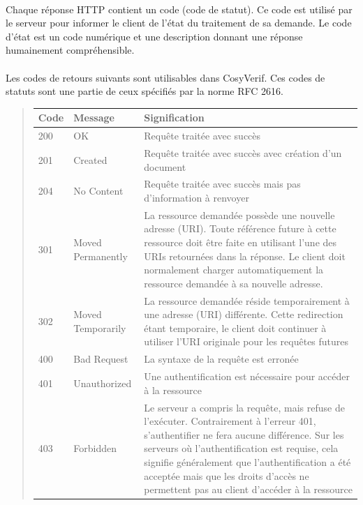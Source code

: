\documentclass{report}
\begin{document}
\paragraph{}
Chaque réponse HTTP contient un code (code de statut). Ce code est utilisé par le serveur pour informer le client de l'état 
du traitement de sa demande. Le code d'état est un code numérique et une description donnant une réponse 
humainement compréhensible. 

\paragraph{}
Les codes de retours suivants sont utilisables dans CosyVerif.
Ces codes de statuts sont une partie de ceux spécifiés par la norme RFC 2616.
\begin{quotation}
\begin{tabular}{|p{1cm}|p{4cm}|p{9cm}|}
\hline \bf Code & \bf Message & \bf Signification \\
\hline 200 & OK & Requête traitée avec succès \\
\hline 201 & Created & Requête traitée avec succès avec création d’un document \\
\hline 204 & No Content & Requête traitée avec succès mais pas d’information à renvoyer \\
\hline 301 & Moved Permanently & La ressource demandée possède une nouvelle adresse (URI). Toute référence future à cette ressource doit être faite en utilisant l'une des URIs retournées dans la réponse. Le client doit normalement charger 
automatiquement la ressource demandée à sa nouvelle adresse. \\
\hline 302 & Moved Temporarily & La ressource demandée réside temporairement à une adresse (URI) différente. Cette 
redirection étant temporaire, le client doit continuer à utiliser l'URI originale pour les requêtes futures \\
\hline 400 & Bad Request & La syntaxe de la requête est erronée \\
\hline 401 & Unauthorized & Une authentification est nécessaire pour accéder à la ressource \\
\hline 403 & Forbidden & Le serveur a compris la requête, mais refuse de l’exécuter. Contrairement à l’erreur 401, 
s’authentifier ne fera aucune différence. Sur les serveurs où l’authentification est requise, cela signifie généralement que 
l’authentification a été acceptée mais que les droits d’accès ne permettent pas au client d’accéder à la ressource \\

\end{tabular}
\end{quotation}
\end{document}
